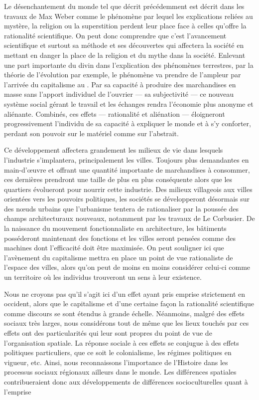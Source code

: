 Le désenchantement du monde tel que décrit précédemment est décrit dans les travaux de Max Weber comme le phénomène par lequel les explications reliées au mystère, la religion ou la superstition perdent leur place face à celles qu'offre la rationalité scientifique. 
On peut donc comprendre que c'est l'avancement scientifique et surtout sa méthode et ses découvertes qui affectera la société en mettant en danger la place de la religion et du mythe dans la société. 
Enlevant une part importante du divin dans l'explication des phénomènes terrestres, par la théorie de l'évolution par exemple, le phénomène va prendre de l'ampleur par l'arrivée du capitalisme au .
Par sa capacité à produire des marchandises en masse sans l'apport individuel de l'ouvrier --- sa subjectivité --- ce nouveau système social gérant le travail et les échanges rendra l'économie plus anonyme et aliénante. 
Combinés, ces effets --- rationalité et aliénation --- éloigneront progressivement l'individu de sa capacité à expliquer le monde et à s'y conforter, perdant son pouvoir sur le matériel comme sur l'abstrait.

Ce développement affectera grandement les milieux de vie dans lesquels l'industrie s'implantera, principalement les villes. 
Toujours plus demandantes en main-d’œuvre et offrant une quantité importante de marchandises à consommer, ces dernières prendront une taille de plus en plus conséquente alors que les quartiers évolueront pour nourrir cette industrie. 
Des milieux villageois aux villes orientées vers les pouvoirs politiques, les sociétés se développeront désormais sur des nœuds urbains que l'urbanisme tentera de rationaliser par la poussée des champs architecturaux nouveaux, notamment par les travaux de Le Corbusier. 
De la naissance du mouvement fonctionnaliste en architecture, les bâtiments posséderont maintenant des fonctions et les villes seront pensées comme des machines dont l'efficacité doit être maximisée\missref{}. 
On peut souligner ici que l'avènement du capitalisme mettra en place un point de vue rationaliste de l'espace des villes, alors qu'on peut de moins en moins considérer celui-ci comme un territoire où les individus trouveront un sens à leur existence.

Nous ne croyons pas qu'il s'agit ici d'un effet ayant pris emprise strictement en occident, alors que le capitalisme et d'une certaine façon la rationalité scientifique comme discours se sont étendus à grande échelle. 
Néanmoins, malgré des effets sociaux très larges, nous considérons tout de même que les lieux touchés par ces effets ont des particularités qui leur sont propres du point de vue de l'organisation spatiale.
La réponse sociale à ces effets se conjugue à des effets politiques particuliers, que ce soit le colonialisme, les régimes politiques en vigueur, etc. 
Ainsi, nous reconnaissons l'importance de l'Histoire dans les processus sociaux régionaux ailleurs dans le monde. 
Les différences spatiales contribueraient donc aux développements de différences socioculturelles quant à l'emprise 

